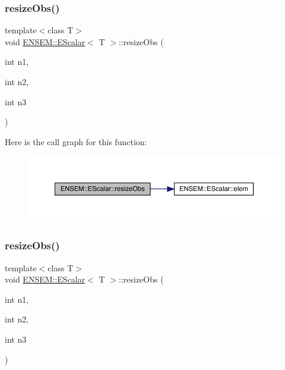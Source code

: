 \subsubsection{\texorpdfstring{resizeObs()}{resizeObs()}\hspace{0.1cm}{\footnotesize\ttfamily [5/8]}}
{\footnotesize\ttfamily template$<$class T$>$ \\
void \mbox{\hyperlink{classENSEM_1_1EScalar}{E\+N\+S\+E\+M\+::\+E\+Scalar}}$<$ T $>$\+::resize\+Obs (\begin{DoxyParamCaption}\item[{int}]{n1,  }\item[{int}]{n2,  }\item[{int}]{n3 }\end{DoxyParamCaption})\hspace{0.3cm}{\ttfamily [inline]}}

Here is the call graph for this function\+:
\nopagebreak
\begin{figure}[H]
\begin{center}
\leavevmode
\includegraphics[width=350pt]{d0/d82/classENSEM_1_1EScalar_a1849b1cf66ab1a983ca9e1f268afd109_cgraph}
\end{center}
\end{figure}
\mbox{\label{classENSEM_1_1EScalar_a1849b1cf66ab1a983ca9e1f268afd109}} 
\subsubsection{\texorpdfstring{resizeObs()}{resizeObs()}\hspace{0.1cm}{\footnotesize\ttfamily [6/8]}}
{\footnotesize\ttfamily template$<$class T$>$ \\
void \mbox{\hyperlink{classENSEM_1_1EScalar}{E\+N\+S\+E\+M\+::\+E\+Scalar}}$<$ T $>$\+::resize\+Obs (\begin{DoxyParamCaption}\item[{int}]{n1,  }\item[{int}]{n2,  }\item[{int}]{n3 }\end{DoxyParamCaption})\hspace{0.3cm}{\ttfamily [inline]}}

